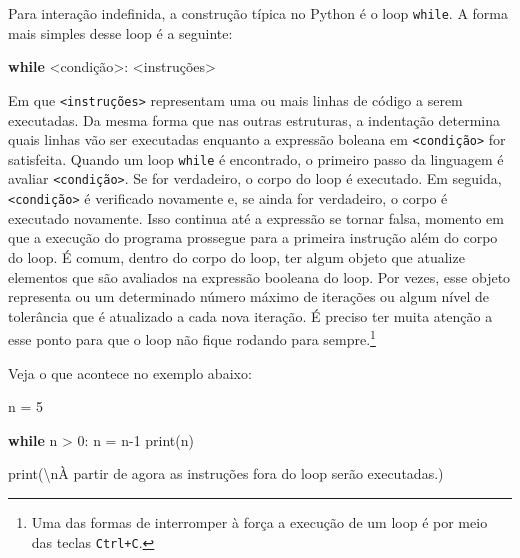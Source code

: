 \documentclass[
  brazilian,
  letterpaper,
  DIV=11,
  numbers=noendperiod]{scrreprt}
\newenvironment{Shaded}{\begin{snugshade}}{\end{snugshade}}
\newcommand{\BuiltInTok}[1]{\textcolor[rgb]{0.00,0.23,0.31}{#1}}
\newcommand{\CharTok}[1]{\textcolor[rgb]{0.13,0.47,0.30}{#1}}
\newcommand{\ControlFlowTok}[1]{\textcolor[rgb]{0.00,0.23,0.31}{\textbf{#1}}}
\newcommand{\DecValTok}[1]{\textcolor[rgb]{0.68,0.00,0.00}{#1}}
\newcommand{\NormalTok}[1]{\textcolor[rgb]{0.00,0.23,0.31}{#1}}
\newcommand{\OperatorTok}[1]{\textcolor[rgb]{0.37,0.37,0.37}{#1}}
\newcommand{\StringTok}[1]{\textcolor[rgb]{0.13,0.47,0.30}{#1}}
\begin{document}
Para interação indefinida, a construção típica no Python é o loop
\texttt{while}. A forma mais simples desse loop é a seguinte:

\begin{Shaded}
\begin{Highlighting}[]
\ControlFlowTok{while} \OperatorTok{\textless{}}\NormalTok{condição}\OperatorTok{\textgreater{}}\NormalTok{:}
    \OperatorTok{\textless{}}\NormalTok{instruções}\OperatorTok{\textgreater{}}
\end{Highlighting}
\end{Shaded}

Em que \texttt{\textless{}instruções\textgreater{}} representam uma ou
mais linhas de código a serem executadas. Da mesma forma que nas outras
estruturas, a indentação determina quais linhas vão ser executadas
enquanto a expressão boleana em
\texttt{\textless{}condição\textgreater{}} for satisfeita. Quando um
loop \texttt{while} é encontrado, o primeiro passo da linguagem é
avaliar \texttt{\textless{}condição\textgreater{}}. Se for verdadeiro, o
corpo do loop é executado. Em seguida,
\texttt{\textless{}condição\textgreater{}} é verificado novamente e, se
ainda for verdadeiro, o corpo é executado novamente. Isso continua até a
expressão se tornar falsa, momento em que a execução do programa
prossegue para a primeira instrução além do corpo do loop. É comum,
dentro do corpo do loop, ter algum objeto que atualize elementos que são
avaliados na expressão booleana do loop. Por vezes, esse objeto
representa ou um determinado número máximo de iterações ou algum nível
de tolerância que é atualizado a cada nova iteração. É preciso ter muita
atenção a esse ponto para que o loop não fique rodando para
sempre.\footnote{Uma das formas de interromper à força a execução de um
  loop é por meio das teclas \texttt{Ctrl+C}.}

Veja o que acontece no exemplo abaixo:

\begin{Shaded}
\begin{Highlighting}[]
\NormalTok{n }\OperatorTok{=} \DecValTok{5}

\ControlFlowTok{while}\NormalTok{ n }\OperatorTok{\textgreater{}} \DecValTok{0}\NormalTok{:}
\NormalTok{    n }\OperatorTok{=}\NormalTok{ n}\OperatorTok{{-}}\DecValTok{1}
    \BuiltInTok{print}\NormalTok{(n)}
    
\BuiltInTok{print}\NormalTok{(}\StringTok{\textquotesingle{}}\CharTok{\textbackslash{}n}\StringTok{À partir de agora as instruções fora do loop serão executadas.\textquotesingle{}}\NormalTok{)}
\end{Highlighting}
\end{Shaded}
\end{document}
